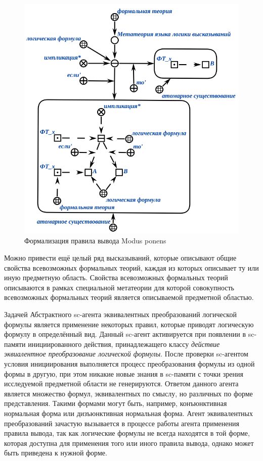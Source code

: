 \begin{figure}[http]
	\includegraphics[scale=0.8]{author/part3/figures/Modus_ponens.png}
	\caption{Формализация правила вывода Modus ponens}
	\label{fig:modus_ponens_formalization}
\end{figure}

Можно привести ещё целый ряд высказываний, которые описывают общие свойства всевозможных формальных теорий, каждая из которых описывает ту или иную предметную область. Свойства всевозможных формальных теорий описываются в рамках специальной метатеории для которой совокупность всевозможных формальных теорий является описываемой предметной областью.

Задачей Абстрактного sc-агента эквивалентных преобразований логической формулы является применение некоторых правил, которые приводят логическую формулу в определённый вид. Данный sc-агент активируется при появлении в sc-памяти инициированного действия, принадлежащего классу \textit{действие эквиалентное преобразование логической формулы}. После проверки sc-агентом условия инициирования выполняется процесс преобразования формулы из одной формы в другую, при этом никакие новые знания в sc-памяти с точки зрения исследуемой предметной области не генерируются. Ответом данного агента является множество формул, эквивалентных по смыслу, но различных по форме представления. Такими формами могут быть, например, конъюнктивная нормальная форма или дизъюнктивная нормальная форма. Агент эквивалентных преобразований зачастую вызывается в процессе работы агента применения правила вывода, так как логические формулы не всегда находятся в той форме, которая доступна для применения того или иного правила вывода, однако может быть приведена к нужной форме.

